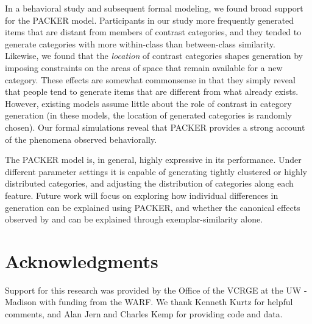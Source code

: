 \documentclass[10pt,letterpaper]{article}
\begin{document}
In a behavioral study and subsequent formal modeling, we found broad support for the PACKER model. Participants in our study more frequently generated items that are distant from members of contrast categories, and they tended to generate categories with more within-class than between-class similarity. Likewise, we found that the \textit{location} of contrast categories shapes generation by imposing constraints on the areas of space that remain available for a new category. These effects are somewhat commonsense in that they simply reveal that people tend to generate items that are different from what already exists. However, existing models \citep[see][]{jern2013probabilistic} assume little about the role of contrast in category generation (in these models, the location of generated categories is randomly chosen). Our formal simulations reveal that PACKER provides a strong account of the phenomena observed behaviorally.

The PACKER model is, in general, highly expressive in its performance. Under different parameter settings it is capable of generating tightly clustered or highly distributed categories, and adjusting the distribution of categories along each feature. Future work will focus on exploring how individual differences in generation can be explained using PACKER, and whether the canonical effects observed by \citet{ward1994structured} and \citet{jern2013probabilistic} can be explained through exemplar-similarity alone.

\section{Acknowledgments}
Support for this research was provided by the Office of the VCRGE at the UW - Madison with funding from the WARF. We thank Kenneth Kurtz for helpful comments, and Alan Jern and Charles Kemp for providing code and data.




\setlength{\bibleftmargin}{.025in}
\setlength{\bibindent}{-\bibleftmargin}

\end{document}
